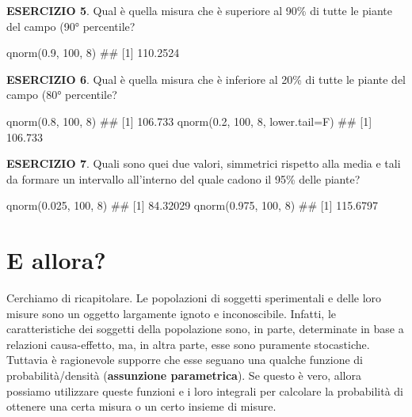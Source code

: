 \documentclass[a4paper,12pt,oneside]{book}
\newenvironment{Shaded}{}{}
\newcommand{\KeywordTok}[1]{#1}
\newcommand{\DataTypeTok}[1]{#1}
\newcommand{\DecValTok}[1]{#1}
\newcommand{\FloatTok}[1]{#1}
\newcommand{\CommentTok}[1]{#1}
\newcommand{\NormalTok}[1]{#1}
\begin{document}
\textbf{ESERCIZIO 5}. Qual è quella misura che è superiore al 90\% di tutte le piante del campo (90° percentile?

\begin{Shaded}
\begin{Highlighting}[]
\KeywordTok{qnorm}\NormalTok{(}\FloatTok{0.9}\NormalTok{, }\DecValTok{100}\NormalTok{, }\DecValTok{8}\NormalTok{)}
\CommentTok{## [1] 110.2524}
\end{Highlighting}
\end{Shaded}

\textbf{ESERCIZIO 6}. Qual è quella misura che è inferiore al 20\% di tutte le piante del campo (80° percentile?

\begin{Shaded}
\begin{Highlighting}[]
\KeywordTok{qnorm}\NormalTok{(}\FloatTok{0.8}\NormalTok{, }\DecValTok{100}\NormalTok{, }\DecValTok{8}\NormalTok{)}
\CommentTok{## [1] 106.733}
\KeywordTok{qnorm}\NormalTok{(}\FloatTok{0.2}\NormalTok{, }\DecValTok{100}\NormalTok{, }\DecValTok{8}\NormalTok{, }\DataTypeTok{lower.tail=}\NormalTok{F)}
\CommentTok{## [1] 106.733}
\end{Highlighting}
\end{Shaded}

\textbf{ESERCIZIO 7}. Quali sono quei due valori, simmetrici rispetto alla media e tali da formare un intervallo all'interno del quale cadono il 95\% delle piante?

\begin{Shaded}
\begin{Highlighting}[]
\KeywordTok{qnorm}\NormalTok{(}\FloatTok{0.025}\NormalTok{, }\DecValTok{100}\NormalTok{, }\DecValTok{8}\NormalTok{)}
\CommentTok{## [1] 84.32029}
\KeywordTok{qnorm}\NormalTok{(}\FloatTok{0.975}\NormalTok{, }\DecValTok{100}\NormalTok{, }\DecValTok{8}\NormalTok{)}
\CommentTok{## [1] 115.6797}
\end{Highlighting}
\end{Shaded}

\hypertarget{e-allora}{%
\section{E allora?}\label{e-allora}}

Cerchiamo di ricapitolare. Le popolazioni di soggetti sperimentali e delle loro misure sono un oggetto largamente ignoto e inconoscibile. Infatti, le caratteristiche dei soggetti della popolazione sono, in parte, determinate in base a relazioni causa-effetto, ma, in altra parte, esse sono puramente stocastiche. Tuttavia è ragionevole supporre che esse seguano una qualche funzione di probabilità/densità (\textbf{assunzione parametrica}). Se questo è vero, allora possiamo utilizzare queste funzioni e i loro integrali per calcolare la probabilità di ottenere una certa misura o un certo insieme di misure.
\end{document}

